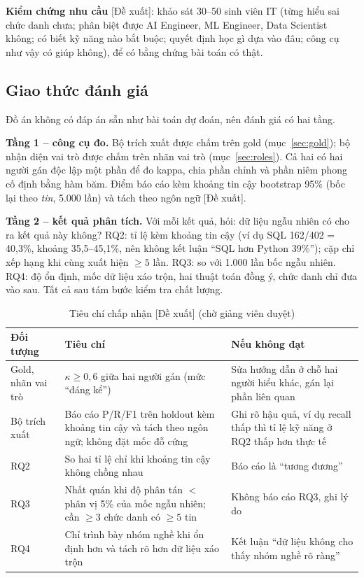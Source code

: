 \documentclass[12pt]{article}
\newcommand{\dexuat}{\textsf{[Đề xuất]}}
\begin{document}
\textbf{Kiểm chứng nhu cầu} \dexuat{}: khảo sát 30--50 sinh viên IT (từng hiểu sai chức danh chưa; phân biệt được AI Engineer, ML Engineer, Data Scientist không; có biết kỹ năng nào bắt buộc; quyết định học gì dựa vào đâu; công cụ như vậy có giúp không), để có bằng chứng bài toán có thật.

\subsection{Giao thức đánh giá}
\label{sec:protocol}

Đồ án không có đáp án sẵn như bài toán dự đoán, nên đánh giá có hai tầng.

\textbf{Tầng 1 -- công cụ đo.} Bộ trích xuất được chấm trên gold (mục~\ref{sec:gold}); bộ nhận diện vai trò được chấm trên nhãn vai trò (mục~\ref{sec:roles}). Cả hai có hai người gán độc lập một phần để đo kappa, chia phần chỉnh và phần niêm phong cố định bằng hàm băm. Điểm báo cáo kèm khoảng tin cậy bootstrap 95\% (bốc lại theo \textit{tin}, 5.000 lần) và tách theo ngôn ngữ \dexuat{}.

\textbf{Tầng 2 -- kết quả phân tích.} Với mỗi kết quả, hỏi: dữ liệu ngẫu nhiên có cho ra kết quả này không? RQ2: tỉ lệ kèm khoảng tin cậy (ví dụ SQL 162/402 = 40,3\%, khoảng 35,5--45,1\%, nên không kết luận ``SQL hơn Python 39\%''); cặp chỉ xếp hạng khi cùng xuất hiện $\ge 5$ lần. RQ3: so với 1.000 lần bốc ngẫu nhiên. RQ4: độ ổn định, mốc dữ liệu xáo trộn, hai thuật toán đồng ý, chức danh chỉ đưa vào sau. Tất cả sau tám bước kiểm tra chất lượng.

\begin{table}[htbp]
\centering
\caption{Tiêu chí chấp nhận \dexuat{} (chờ giảng viên duyệt)}
\label{tab:acceptance}
\renewcommand{\arraystretch}{1.15}
\begin{tabularx}{\textwidth}{l X X}
\toprule
\textbf{Đối tượng} & \textbf{Tiêu chí} & \textbf{Nếu không đạt} \\
\midrule
Gold, nhãn vai trò & $\kappa \ge 0{,}6$ giữa hai người gán (mức ``đáng kể'') & Sửa hướng dẫn ở chỗ hai người hiểu khác, gán lại phần liên quan \\
Bộ trích xuất & Báo cáo P/R/F1 trên holdout kèm khoảng tin cậy và tách theo ngôn ngữ; không đặt mốc đỗ cứng & Ghi rõ hậu quả, ví dụ recall thấp thì tỉ lệ kỹ năng ở RQ2 thấp hơn thực tế \\
RQ2 & So hai tỉ lệ chỉ khi khoảng tin cậy không chồng nhau & Báo cáo là ``tương đương'' \\
RQ3 & Nhất quán khi độ phân tán $<$ phân vị 5\% của mốc ngẫu nhiên; cần $\ge 3$ chức danh có $\ge 5$ tin & Không báo cáo RQ3, ghi lý do \\
RQ4 & Chỉ trình bày nhóm nghề khi ổn định hơn và tách rõ hơn dữ liệu xáo trộn & Kết luận ``dữ liệu không cho thấy nhóm nghề rõ ràng'' \\
\bottomrule
\end{tabularx}
\end{table}
\end{document}
